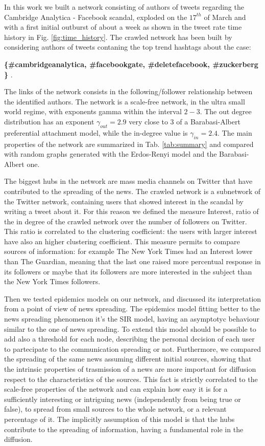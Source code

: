 \documentclass[11pt, twoside]{report}
\begin{document}
    In this work we built a network consisting of authors of tweets regarding the Cambridge Analytica - Facebook scandal, exploded on the $17^{th}$ of March and with a first initial outburst of about a week as shown in the tweet rate time history in Fig. \ref{fig:time_history}.
    The crawled network has been built by considering authors of tweets contaning the top trend hashtags about the case:\\
\begin{center}
    \textbf{  \{\#cambridgeanalytica, \#facebookgate, \#deletefacebook, \#zuckerberg \} }.
\end{center}
    The links of the network consists in the following/follower relationship between the identified authors.
    The network is a scale-free network, in the ultra small world regime, with exponents gamma within the interval $2-3$.
    The out degree distribution has an exponent $\gamma_{out}=2.9 $ very close to 3 of a Barabasi-Albert preferential attachment model,
    while the in-degree value is $\gamma_{in} = 2.4$. The main properties of the network are summarized in Tab. \ref{tab:summary} and compared with random graphs generated with the Erdos-Renyi model and the Barabasi-Albert one.

    The biggest hubs in the network are mass media channels on Twitter that have contributed to the spreading of the news.
    The crawled network is a subnetwork of the Twitter network, containing users that showed interest in the scandal by writing a tweet about it.
    For this reason we defined the measure Interest, ratio of the in degree of the crawled network over the number of followers on Twitter.
    This ratio is correlated to the clustering coefficient: the users with larger interest have also an higher clustering coefficient.
    This measure permits to compare sources of information: for example The New York Times had an Interest lower than The Guardian,
    meaning that the last one raised more percentual response in its followers or maybe that its followers are more interested in the subject
    than the New York Times followers.

    Then we tested epidemics models on our network, and discussed its interpretation from a point of view of news spreading.
    The epidemics model fitting better to the news spreading phenomenon it's the SIR model, having an asymptotyc behaviour similar to
    the one of news spreading. To extend this model should be possible to add also a threshold for each node, describing the
    personal decision of each user to partecipate to the communication spreading or not.
    Furthermore, we compared the spreading of the same news assuming different initial sources, showing that the intrinsic properties of trasmission of a news are more important for diffusion respect to the characteristics of the sources.
    This fact is strictly correlated to the scale-free properties of the network and can explain how easy it is for a sufficiently interesting or intriguing news (independently from being true or false), to spread from small sources to the whole network, or a relevant percentage of it.
    The implicitly assumption of this model is that the hubs contribute to the spreading of information, having a fundamental role in the diffusion.
\end{document}
